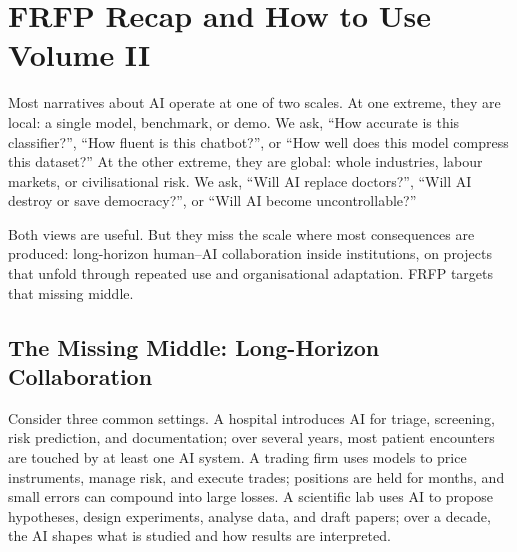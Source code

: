
\chapter{FRFP Recap and How to Use Volume II}
\label{ch:vol2-intro-recap}

Most narratives about AI operate at one of two scales. At one extreme, they are local: a single model, benchmark, or demo. We ask, ``How accurate is this classifier?'', ``How fluent is this chatbot?'', or ``How well does this model compress this dataset?'' At the other extreme, they are global: whole industries, labour markets, or civilisational risk. We ask, ``Will AI replace doctors?'', ``Will AI destroy or save democracy?'', or ``Will AI become uncontrollable?''

Both views are useful. But they miss the scale where most consequences are produced: long-horizon human--AI collaboration inside institutions, on projects that unfold through repeated use and organisational adaptation. FRFP targets that missing middle.

\section{The Missing Middle: Long-Horizon Collaboration}

Consider three common settings. A hospital introduces AI for triage, screening, risk prediction, and documentation; over several years, most patient encounters are touched by at least one AI system. A trading firm uses models to price instruments, manage risk, and execute trades; positions are held for months, and small errors can compound into large losses. A scientific lab uses AI to propose hypotheses, design experiments, analyse data, and draft papers; over a decade, the AI shapes what is studied and how results are interpreted.

